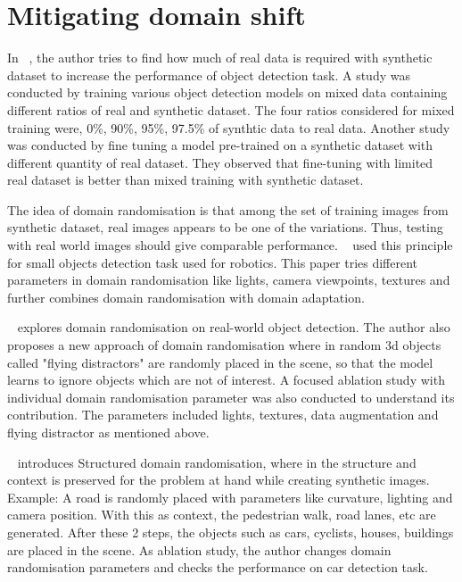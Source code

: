 \section{Mitigating domain shift}\label{sec:mitigating_domain_shift}


In ~\cite{nowruzi2019real}, the author tries to find how much of real data is required with synthetic dataset to increase the performance of object detection task.
A study was conducted by training various object detection models on mixed data containing different ratios of real and synthetic dataset.
The four ratios considered for mixed training were, 0\%, 90\%, 95\%, 97.5\% of synthtic data to real data.
Another study was conducted by fine tuning a model pre-trained on a synthetic dataset with different quantity of real dataset.
They observed that fine-tuning with limited real dataset is better than mixed training with synthetic dataset.

The idea of domain randomisation is that among the set of training images from synthetic dataset, real images appears to be one of the variations.
Thus, testing with real world images should give comparable performance.
~\cite{tobin2017domain} used this principle for small objects detection task used for robotics.
This paper tries different parameters in domain randomisation like lights, camera viewpoints, textures and further combines domain randomisation with domain adaptation.

~\cite{Tremblay2018TrainingDN} explores domain randomisation on real-world object detection.
The author also proposes a new approach of domain randomisation where in random 3d objects called "flying distractors" are randomly placed in the scene,
so that the model learns to ignore objects which are not of interest.
A focused ablation study with individual domain randomisation parameter was also conducted to understand its contribution.
The parameters included lights, textures, data augmentation and flying distractor as mentioned above.

~\cite{prakash2020structured} introduces Structured domain randomisation, where in the structure and context is preserved for the problem at hand while creating synthetic images.
Example: A road is randomly placed with parameters like curvature, lighting and camera position.
With this as context, the pedestrian walk, road lanes, etc are generated.
After these 2 steps, the objects such as cars, cyclists, houses, buildings are placed in the scene.
As ablation study, the author changes domain randomisation parameters and checks the performance on car detection task.

